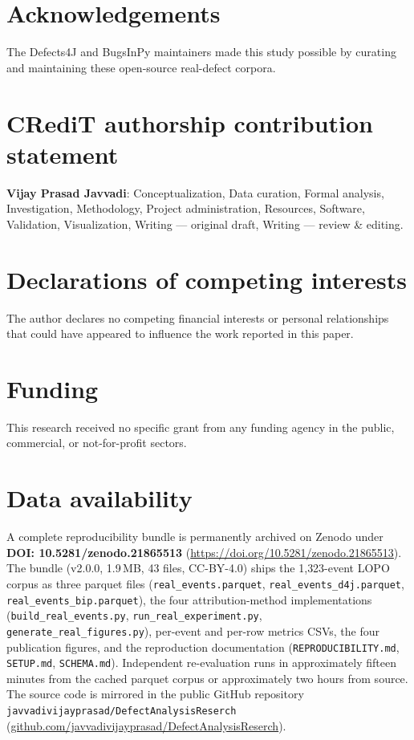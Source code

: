 \documentclass[preprint,12pt]{elsarticle}
\begin{document}
\section*{Acknowledgements}
The Defects4J and BugsInPy maintainers made this study possible by curating and maintaining these open-source real-defect corpora.

\section*{CRediT authorship contribution statement}
\textbf{Vijay Prasad Javvadi}: Conceptualization, Data curation,
Formal analysis, Investigation, Methodology, Project administration,
Resources, Software, Validation, Visualization, Writing --- original
draft, Writing --- review \& editing.

\section*{Declarations of competing interests}
The author declares no competing financial interests or personal
relationships that could have appeared to influence the work reported
in this paper.

\section*{Funding}
This research received no specific grant from any funding agency in
the public, commercial, or not-for-profit sectors.

\section*{Data availability}
A complete reproducibility bundle is permanently archived on Zenodo
under \textbf{DOI: 10.5281/zenodo.21865513}
(\href{https://doi.org/10.5281/zenodo.21865513}{https://doi.org/10.5281/zenodo.21865513}).
The bundle (v2.0.0, 1.9\,MB, 43 files, CC-BY-4.0) ships the 1{,}323-event
LOPO corpus as three parquet files (\texttt{real\_events.parquet},
\texttt{real\_events\_d4j.parquet}, \texttt{real\_events\_bip.parquet}),
the four attribution-method implementations
(\texttt{build\_real\_events.py}, \texttt{run\_real\_experiment.py},
\texttt{generate\_real\_figures.py}), per-event and per-row metrics
CSVs, the four publication figures, and the reproduction documentation
(\texttt{REPRODUCIBILITY.md}, \texttt{SETUP.md}, \texttt{SCHEMA.md}).
Independent re-evaluation runs in approximately fifteen minutes from
the cached parquet corpus or approximately two hours from source. The
source code is mirrored in the public GitHub repository
\texttt{javvadivijayprasad/DefectAnalysisReserch}
(\href{https://github.com/javvadivijayprasad/DefectAnalysisReserch}{github.com/javvadivijayprasad/DefectAnalysisReserch}).
\end{document}
